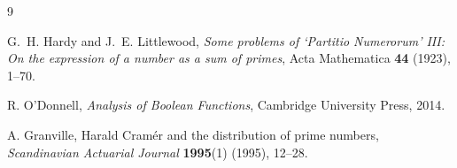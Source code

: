 \documentclass[11pt]{article}
\begin{document}

\begin{thebibliography}{9}

G.~H. Hardy and J.~E. Littlewood,
\textit{Some problems of `Partitio Numerorum' III: On the expression of a number as a sum of primes},
Acta Mathematica \textbf{44} (1923), 1--70.

R. O'Donnell,
\textit{Analysis of Boolean Functions},
Cambridge University Press, 2014.

A. Granville,
Harald Cram\'er and the distribution of prime numbers,
\textit{Scandinavian Actuarial Journal} \textbf{1995}(1) (1995), 12--28.

\end{thebibliography}
\end{document}
